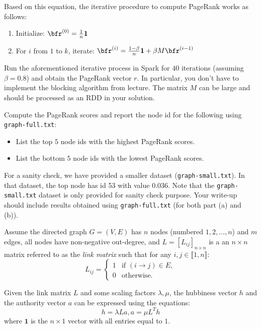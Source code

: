 Based on this equation, the iterative procedure to compute PageRank works as follows:

\begin{enumerate}
  \item Initialize: $\bfr^{(0)} = \frac{1}{n}{\mathbf{1}}$
  \item For $i$ from $1$ to $k$, iterate: $\bfr^{(i)} = \frac{1-\beta}{n}{\mathbf{1}} + \beta M\bfr^{(i-1)}$
\end{enumerate}

Run the aforementioned iterative process in Spark for $40$ iterations (assuming
$\beta = 0.8$) and obtain the PageRank vector $r$. In particular, you don't
have to implement the blocking algorithm from lecture. The matrix $M$ can be
large and should be processed as an RDD in your solution. 

Compute the PageRank scores and report the node id for the following using \texttt{graph-full.txt}:
\begin{itemize}
\item List the top $5$ node ids with the highest PageRank scores. 
\item List the bottom $5$ node ids with the lowest PageRank scores.
\end{itemize}

For a sanity check, we have provided a smaller dataset (\texttt{graph-small.txt}). In that dataset,
the top node has id 53 with value 0.036. Note that the \texttt{graph-small.txt} dataset is only provided for sanity check purpose. Your write-up should include results obtained using \texttt{graph-full.txt} (for both part (a) and (b)).


Assume the directed graph $G=(V,E)$ has $n$ nodes (numbered $1,2, \ldots, n$) and $m$ edges, all nodes have non-negative out-degree, and $L=[L_{ij}]_{n\times n}$ is a an $n\times n$ matrix referred to as the \emph{link matrix} such that for any $i,j \in \llbracket 1, n\rrbracket$:
\[
	L_{ij} =
	\left\{
		\begin{array}{cl}
			1	& \text{if } (i\to j)\in E, \\
			0									& \text{otherwise}.
		\end{array}
	\right.
\]

Given the link matrix $L$ and some scaling factors $\lambda, \mu$, the hubbiness vector $h$ and the authority vector $a$ can be expressed using the equations:
\begin{equation}\label{PageRankDefn}
	h = \lambda L a,
	a = \mu L^{T} h	
\end{equation}
where ${\mathbf{1}}$ is the $n \times 1$ vector with all entries equal to $1$.

